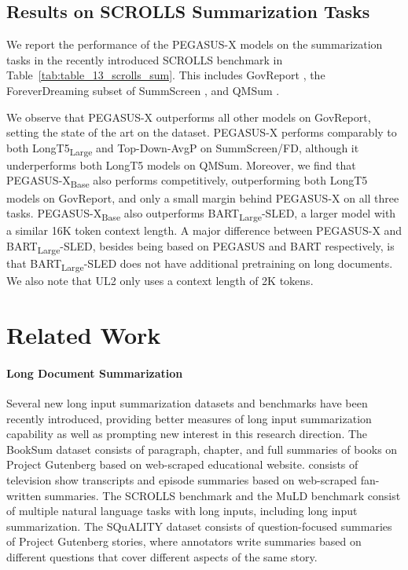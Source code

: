 \documentclass[11pt]{article}
\newcommand{\largemodel}{PEGASUS-X}
\newcommand{\smallmodel}{{PEGASUS-X\textsubscript{Base}}}
\begin{document}
\subsection{Results on SCROLLS Summarization Tasks}



We report the performance of the \largemodel{} models on the summarization tasks in the recently introduced SCROLLS benchmark in Table~\ref{tab:table_13_scrolls_sum}. This includes GovReport \citep{huang2021govreport}, the ForeverDreaming subset of SummScreen \citep{chen2022summscreen}, and QMSum \citep{zhong2021qmsum}.

We observe that \largemodel{} outperforms all other models on GovReport, setting the state of the art on the dataset. 
\largemodel{} performs comparably to both LongT5\textsubscript{Large} and Top-Down-AvgP on SummScreen/FD, although it underperforms both LongT5 models on QMSum. 
Moreover, we find that \smallmodel{} also performs competitively, outperforming both LongT5 models on GovReport, and only a small margin behind \largemodel{} on all three tasks.
\smallmodel{} also outperforms BART\textsubscript{Large}-SLED, a larger model with a similar 16K token context length.
A major difference between \largemodel{} and BART\textsubscript{Large}-SLED, besides being based on PEGASUS and BART respectively, is that BART\textsubscript{Large}-SLED does not have additional pretraining on long documents.
We also note that UL2 only uses a context length of 2K tokens.





\section{Related Work}
\paragraph{Long Document Summarization} 
Several new long input summarization datasets and benchmarks have been recently introduced, providing better measures of long input summarization capability as well as prompting new interest in this research direction.
The BookSum dataset \citep{kryscinski2021booksum} consists of paragraph, chapter, and full summaries of books on Project Gutenberg based on web-scraped educational website.
\citep{chen2022summscreen} consists of television show transcripts and episode summaries based on web-scraped fan-written summaries.
The SCROLLS benchmark \citep{shaham2022scrolls} and the MuLD benchmark \citep{hudson2022muld} consist of multiple natural language tasks with long inputs, including long input summarization.
The SQuALITY dataset \citep{wang2022squality} consists of question-focused summaries of Project Gutenberg stories, where annotators write summaries based on different questions that cover different aspects of the same story.
\end{document}
